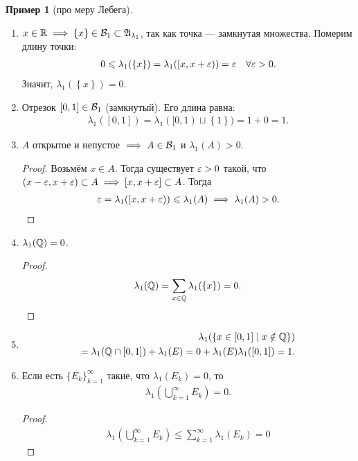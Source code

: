\documentclass[a4paper,14pt]{extarticle}
\newcounter{theoremCnt}
\theoremstyle{definition}
\theoremstyle{plain}
\theoremstyle{plain}
\theoremstyle{plain}
\theoremstyle{plain}
\theoremstyle{definition}
\newtheorem{exmpl}[theoremCnt]{Пример}
\theoremstyle{definition}
\theoremstyle{definition}
\theoremstyle{definition}
\theoremstyle{definition}
\theoremstyle{definition}
\theoremstyle{plain}
\theoremstyle{plain}
\theoremstyle{plain}
\theoremstyle{plain}
\theoremstyle{definition}
\theoremstyle{definition}
\theoremstyle{definition}
\theoremstyle{definition}
\theoremstyle{definition}
\newcommand{\R}{\ensuremath \mathbb{R}}
\newcommand{\Q}{\ensuremath \mathbb{Q}}
\newcommand{\eps}{\ensuremath \varepsilon}
\newcommand{\A}{\ensuremath \mathfrak{A}}
\begin{document}
\begin{exmpl}[про меру Лебега]\
 \begin{enumerate}
  \item $x \in \R \implies \left\{ x \right\} \in \B_1 \subset \A_{\lambda_1}$, так как точка --- замкнутая множества. Померим длину точки:
   \begin{align*}
    0 \leqslant \lambda_1(\left\{ x \right\}) = \lambda_1([x, x + \varepsilon)) = \varepsilon \quad \forall \eps > 0
   .\end{align*} Значит, $\lambda_1(\left\{ x \right\}) = 0$.
  \item Отрезок $[0, 1] \in \mathcal{B}_1$ (замкнутый). Его длина равна:
   \begin{align*}
    \lambda_1([0,1]) = \lambda_1([0, 1) \sqcup \left\{ 1 \right\}) = 1 + 0 = 1
   .\end{align*}
  \item $A$ открытое и непустое $ \implies A \in \mathcal{B}_1$ и $\lambda_1(A) > 0$.
   \begin{proof}
    Возьмём $x \in A$. Тогда существует $\eps > 0$ такой, что $(x - \eps, x + \eps) \subset A \implies [x, x + \eps] \subset A$. Тогда
    \begin{align*}
     \eps = \lambda_1( [x, x + \eps) ) \leqslant \lambda_1(A) \implies \lambda_1(A) > 0
    .\end{align*}
   \end{proof}
  \item $\lambda_1(\Q) = 0$.
   \begin{proof}
    \begin{align*}
     \lambda_1(\Q) = \sum_{x \in \Q} \lambda_1(\left\{ x \right\}) = 0
    .\end{align*}
   \end{proof}
  \item \begin{align*}
    \lambda_1( \left\{ x \in [0,1] \mid x \notin \Q \right\} ) \\
    = \lambda_1(\Q \cap [0, 1]) + \lambda_1(E) = 0 + \lambda_1(E) \lambda_1([0, 1]) = 1
   .\end{align*}
  \item Если есть $\{E_{k}\}_{k=1}^{\infty} $ такие, что $\lambda_1(E_k) = 0$, то
   \begin{align*}
    \lambda_1 \left( \bigcup_{k=1}^{\infty} E_k \right) = 0
   .\end{align*}
   \begin{proof}
    \begin{align*}
     \lambda_1 \left( \bigcup_{k=1}^{\infty} E_k \right) \leqslant \sum_{k=1}^{\infty} \lambda_1(E_k) = 0

\end{align*}
\end{proof}
\end{enumerate}
\end{exmpl}
\end{document}
